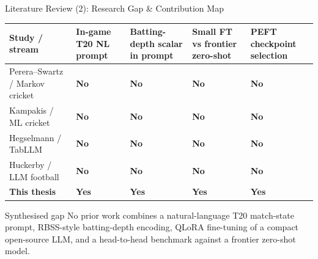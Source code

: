 \documentclass[aspectratio=169,10pt]{beamer}
\newcommand{\tick}{\textcolor{DeepGreen}{\textbf{Yes}}}
\newcommand{\cross}{\textcolor{WarmRed}{\textbf{No}}}
\begin{document}
\begin{frame}{Literature Review (2): Research Gap \& Contribution Map}
\scriptsize
\renewcommand{\arraystretch}{1.25}
\begin{tabularx}{\textwidth}{@{}p{3.0cm}>{\centering\arraybackslash}p{2.2cm}>{\centering\arraybackslash}p{2.4cm}>{\centering\arraybackslash}p{2.6cm}>{\centering\arraybackslash}X@{}}
\toprule
\textbf{Study / stream} & \textbf{In-game T20 NL prompt} & \textbf{Batting-depth scalar in prompt} & \textbf{Small FT vs frontier zero-shot} & \textbf{PEFT checkpoint selection} \\
\midrule
Perera--Swartz / Markov cricket & \cross & \cross & \cross & \cross \\
Kampakis / ML cricket & \cross & \cross & \cross & \cross \\
Hegselmann / TabLLM & \cross & \cross & \cross & \cross \\
Huckerby / LLM football & \cross & \cross & \cross & \cross \\
\rowcolor{PaleGreen}
\textbf{This thesis} & \tick & \tick & \tick & \tick \\
\bottomrule
\end{tabularx}

\vspace{0.45cm}
\begin{block}{Synthesised gap}
No prior work combines a natural-language T20 match-state prompt, RBSS-style batting-depth encoding, QLoRA fine-tuning of a compact open-source LLM, and a head-to-head benchmark against a frontier zero-shot model.
\end{block}
\end{frame}
\end{document}
